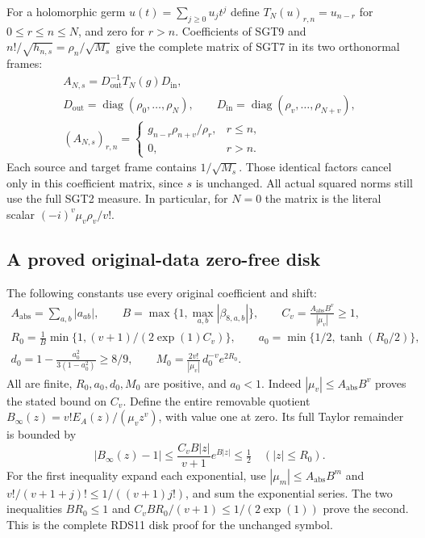 \documentclass[10pt]{article}
\begin{document}
For a holomorphic germ $u(t)=\sum_{j\ge0}u_jt^j$ define
$T_N(u)_{r,n}=u_{n-r}$ for $0\le r\le n\le N$, and zero for $r>n$.
Coefficients of SGT9 and $n!/\sqrt{h_{n,s}}=\rho_n/\sqrt{M_s}$
give the complete matrix of SGT7 in its two orthonormal frames:
\[
\begin{gathered}
 A_{N,s}=D_{\mathrm{out}}^{-1}T_N(g)D_{\mathrm{in}},\\
 D_{\mathrm{out}}=\operatorname{diag}(\rho_0,\ldots,\rho_N),
 \qquad
 D_{\mathrm{in}}=\operatorname{diag}(\rho_v,\ldots,\rho_{N+v}),\\
 (A_{N,s})_{r,n}=
 \begin{cases}
 g_{n-r}\rho_{n+v}/\rho_r,&r\le n,\\0,&r>n .
 \end{cases}
\end{gathered}\tag{SGT10}
\]
Each source and target frame contains $1/\sqrt{M_s}$. Those identical
factors cancel only in this coefficient matrix, since $s$ is unchanged.
All actual squared norms still use the full SGT2 measure.
In particular, for $N=0$ the matrix is the literal scalar
$(-i)^v\mu_v\rho_v/v!$.

\subsection{A proved original-data zero-free disk}

The following constants use every original coefficient and shift:
\[
\begin{gathered}
 A_{\mathrm{abs}}=\sum_{a,b}|a_{ab}|,\qquad
 B=\max\{1,\max_{a,b}|\beta_{8,a,b}|\},\qquad
 C_v=\frac{A_{\mathrm{abs}}B^v}{|\mu_v|}\ge1,\\
 R_0=\frac1B\min\{1,(v+1)/(2\exp(1)C_v)\},\qquad
 a_0=\min\{1/2,\tanh(R_0/2)\},\\
 d_0=1-\frac{a_0^2}{3(1-a_0^2)}\ge8/9,\qquad
 M_0=\frac{2v!}{|\mu_v|}\,d_0^{-v}e^{2R_0}.
\end{gathered}\tag{SGT11}
\]
All are finite, $R_0,a_0,d_0,M_0$ are positive, and $a_0<1$.
Indeed $|\mu_v|\le A_{\mathrm{abs}}B^v$ proves the stated bound
on $C_v$. Define the entire removable quotient
$B_\infty(z)=v!E_A(z)/(\mu_vz^v)$, with value one at zero.
Its full Taylor remainder is bounded by
\[
 |B_\infty(z)-1|
 \le\frac{C_vB|z|}{v+1}e^{B|z|}
 \le\tfrac12\quad(|z|\le R_0).
 \tag{SGT12}
\]
For the first inequality expand each exponential, use
$|\mu_m|\le A_{\mathrm{abs}}B^m$ and
$v!/(v+1+j)!\le1/((v+1)j!)$, and sum the exponential series.
The two inequalities $BR_0\le1$ and
$C_vBR_0/(v+1)\le1/(2\exp(1))$ prove the second.
This is the complete RDS11 disk proof for the unchanged symbol.
\end{document}
